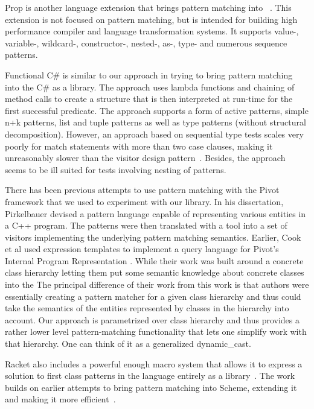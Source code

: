 
Prop is another language extension that brings pattern matching into 
\Cpp{}~\cite{Prop96}. This extension is not focused on pattern 
matching, but is intended for building high performance 
compiler and language transformation systems. It supports value-, variable-, 
wildcard-, constructor-, nested-, as-, type- and numerous sequence patterns.

Functional C\# is similar to our approach in trying to bring pattern matching 
into the C\# as a library\cite{FuncCSharp}. The approach uses lambda functions 
and chaining of method calls to create a structure that is then interpreted at 
run-time for the first successful predicate. The approach supports a form of 
active patterns, simple n+k patterns, list and tuple patterns as well as type 
patterns (without structural decomposition). 
However, an approach based on sequential type tests 
scales very poorly for match statements with more than two case clauses, making 
it unreasonably slower than the visitor design pattern~\cite{TypeSwitch}. Besides, the approach 
seems to be ill suited for tests involving nesting of patterns.

There has been previous attempts to use pattern matching with the Pivot 
framework that we used to experiment with our library. In his dissertation, 
Pirkelbauer devised a pattern language capable of representing various entities 
in a C++ program. The patterns were then translated with a tool into a set of 
visitors implementing the underlying pattern matching 
semantics\cite{PirkelbauerThesis}. Earlier, Cook et al used expression templates 
to implement a query language for Pivot's Internal Program Representation 
\cite{iql04}. While their work was built around a concrete class hierarchy 
letting them put some semantic knowledge about concrete classes into the 
The principal difference of their work from this work is that 
authors were essentially creating a pattern matcher for a given class hierarchy 
and thus could take the semantics of the entities represented by classes in the 
hierarchy into account. Our approach is parametrized over class hierarchy and 
thus provides a rather lower level pattern-matching functionality that lets one 
simplify work with that hierarchy.  One can think of it as a generalized 
dynamic\_cast.

Racket also includes a powerful enough macro system that allows it to express a 
solution to first class patterns in the language entirely as a 
library~\cite{Tobin-Hochstadt_2010}. The work builds on earlier attempts to 
bring pattern matching into Scheme, extending it and making it more efficient~\cite{Wright95}.

